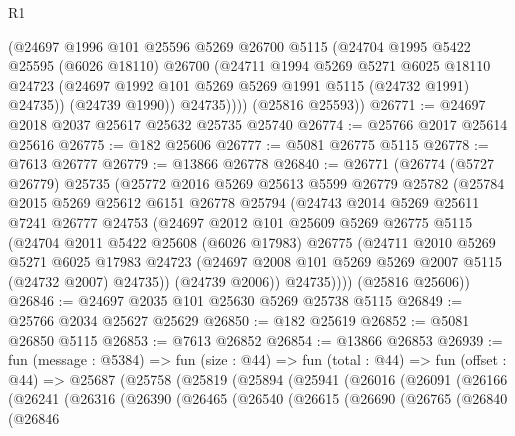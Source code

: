 \begin{lexlean}{R1}
\begin{coremodule}
            (@24697
              @1996
              @101
              @25596
              @5269
              @26700
              @5115
              (@24704
                @1995
                @5422
                @25595
                (@6026 @18110)
                @26700
                (@24711
                  @1994
                  @5269
                  @5271
                  @6025
                  @18110
                  @24723
                  (@24697 @1992 @101 @5269 @5269 @1991 @5115 (@24732 @1991) @24735))
                (@24739 @1990))
              @24735))))
      (@25816 @25593))
@26771 := @24697 @2018 @2037 @25617 @25632 @25735 @25740
@26774 := @25766 @2017 @25614 @25616
@26775 := @182 @25606
@26777 := @5081 @26775 @5115
@26778 := @7613 @26777
@26779 := @13866 @26778
@26840 := @26771
    (@26774
      (@5727 @26779)
      @25735
      (@25772
        @2016
        @5269
        @25613
        @5599
        @26779
        @25782
        (@25784
          @2015
          @5269
          @25612
          @6151
          @26778
          @25794
          (@24743
            @2014
            @5269
            @25611
            @7241
            @26777
            @24753
            (@24697
              @2012
              @101
              @25609
              @5269
              @26775
              @5115
              (@24704
                @2011
                @5422
                @25608
                (@6026 @17983)
                @26775
                (@24711
                  @2010
                  @5269
                  @5271
                  @6025
                  @17983
                  @24723
                  (@24697 @2008 @101 @5269 @5269 @2007 @5115 (@24732 @2007) @24735))
                (@24739 @2006))
              @24735))))
      (@25816 @25606))
@26846 := @24697 @2035 @101 @25630 @5269 @25738 @5115
@26849 := @25766 @2034 @25627 @25629
@26850 := @182 @25619
@26852 := @5081 @26850 @5115
@26853 := @7613 @26852
@26854 := @13866 @26853
@26939 := fun (message : @5384) =>
  fun (size : @44) =>
  fun (total : @44) =>
  fun (offset : @44) =>
  @25687
    (@25758
      (@25819
        (@25894
          (@25941
            (@26016
              (@26091
                (@26166
                  (@26241
                    (@26316
                      (@26390
                        (@26465
                          (@26540
                            (@26615
                              (@26690
                                (@26765
                                  (@26840
                                    (@26846

\end{coremodule}
\end{lexlean}
